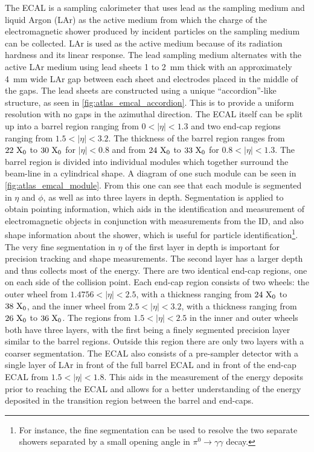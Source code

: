 The ECAL is a sampling calorimeter that uses lead as the sampling
medium and liquid Argon (LAr) as
the active medium from which the charge of the electromagnetic
shower produced by incident particles on the sampling medium
can be collected.  LAr is used as the active medium 
because of its radiation hardness and its linear response.
The lead sampling medium alternates with the active LAr medium
using lead sheets 1 to 2~mm thick with an approximately 4~mm wide
LAr gap between each sheet and electrodes placed in the middle of
the gaps.
The lead sheets are constructed using a unique ``accordion''-like structure,
as seen in \fig\ref{fig:atlas_emcal_accordion}. 
This is to provide a uniform resolution with no gaps
in the azimuthal direction.
The ECAL itself can be split up into a barrel region ranging
from $0<|\eta|<1.3$ and two end-cap regions ranging from 
$1.5 < |\eta| < 3.2$.
The thickness of the barrel region 
ranges from $22~\textrm{X}_0$ to $30~\textrm{X}_0$
for $|\eta|<0.8$ and from $24~\textrm{X}_0$ to $33~\textrm{X}_0$ for
$0.8 < |\eta| < 1.3$.
The barrel region is divided into individual modules
which together surround the beam-line
in a cylindrical shape.  A diagram of one such module
can be seen in \fig\ref{fig:atlas_emcal_module}.
From this one can see that each module is segmented in $\eta$
and $\phi$, as well as into three layers in depth.
Segmentation is applied to obtain pointing information, 
which aids in the identification and measurement of electromagnetic
objects in conjunction with measurements from the ID,
and also shape information about the shower, which is useful
for particle identification\footnote{For instance,
the fine segmentation can be used to resolve the two
separate showers separated by a small opening angle in 
$\pi^0\to\gamma\gamma$ decay.}.
The very fine segmentation in $\eta$ of the first layer
in depth is important for precision tracking and shape measurements.
The second layer has a larger depth and thus collects most of the energy.
There are two identical end-cap regions, one on each side of the 
collision point. Each end-cap region consists of two wheels: the 
outer wheel from $1.4756 < |\eta| < 2.5$, with a thickness ranging from
$24~\textrm{X}_0$ to $38~\textrm{X}_0$, and 
the inner wheel from $2.5 < |\eta| < 3.2$, with a thickness ranging from
$26~\textrm{X}_0$ to $36~\textrm{X}_0$.
The regions from $1.5 < |\eta|<2.5$ in the inner and outer wheels both
have three layers, with the first being a finely segmented precision
layer similar to the barrel regions. Outside this region there 
are only two layers with a coarser segmentation.
The ECAL also consists of a pre-sampler detector with a single layer of LAr in 
front of the full barrel ECAL and in front of the end-cap ECAL 
from $1.5 < |\eta| < 1.8$. This aids in the measurement of the energy deposits
prior to reaching the ECAL and allows 
for a better understanding of the energy deposited
in the transition region between the barrel and end-caps.


